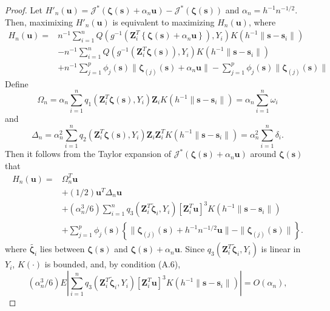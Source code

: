 \documentclass[authoryear,review, 12pt]{elsarticle}
\begin{document}
\begin{proof}
Let $H'_{n}(\bm{u})=\mathcal{J}^{*}\left(\bm{\zeta}(\bm{s})+\alpha_{n}\bm{u}\right)-\mathcal{J}^{*}\left(\bm{\zeta}(\bm{s})\right)$
and $\alpha_{n}=h^{-1}n^{-1/2}$. Then, maximixing $H'_{n}(\bm{u})$
is equivalent to maximizing $H_{n}(\bm{u})$, where 
\begin{align*}
H_{n}(\bm{u})= & n^{-1}\sum_{i=1}^{n}Q\left(g^{-1}\left(\bm{Z}_{i}^{T}\left\{ \bm{\zeta}(\bm{s})+\alpha_{n}\bm{u}\right\} \right),Y_{i}\right)K\left(h^{-1}\|\bm{s}-\bm{s}_{i}\|\right)\\
 & -n^{-1}\sum_{i=1}^{n}Q\left(g^{-1}\left(\bm{Z}_{i}^{T}\bm{\zeta}(\bm{s})\right),Y_{i}\right)K\left(h^{-1}\|\bm{s}-\bm{s}_{i}\|\right)\\
 & +n^{-1}\sum_{j=1}^{p}\phi_{j}\left(\bm{s}\right)\|\bm{\zeta}_{(j)}(\bm{s})+\alpha_{n}\bm{u}\|-\sum_{j=1}^{p}\phi_{j}\left(\bm{s}\right)\|\bm{\zeta}_{(j)}(\bm{s})\|
\end{align*}
Define
\[
\Omega_{n}=\alpha_{n}\sum_{i=1}^{n}q_{1}\left(\bm{Z}_{i}^{T}\bm{\zeta}(\bm{s}),Y_{i}\right)\bm{Z}_{i}K\left(h^{-1}\|\bm{s}-\bm{s}_{i}\|\right)=\alpha_{n}\sum_{i=1}^{n}\omega_{i}
\]
and 
\[
\Delta_{n}=\alpha_{n}^{2}\sum_{i=1}^{n}q_{2}\left(\bm{Z}_{i}^{T}\bm{\zeta}(\bm{s}),Y_{i}\right)\bm{Z}_{i}\bm{Z}_{i}^{T}K\left(h^{-1}\|\bm{s}-\bm{s}_{i}\|\right)=\alpha_{n}^{2}\sum_{i=1}^{n}\delta_{i}.
\]
Then it follows from the Taylor expansion of $\mathcal{J}^{*}\left(\bm{\zeta}(\bm{s})+\alpha_{n}\bm{u}\right)$
around $\bm{\zeta}(\bm{s})$ that
\begin{align}
H_{n}\left(\bm{u}\right)= & \Omega_{n}^{T}\bm{u}\nonumber \\
 & +(1/2)\bm{u}^{T}\Delta_{n}\bm{u}\nonumber \\
 & +\left(\alpha_{n}^{3}/6\right)\sum_{i=1}^{n}q_{3}\left(\bm{Z}_{i}^{T}\tilde{\bm{\zeta}}_{i},Y_{i}\right)\left[\bm{Z}_{i}^{T}\bm{u}\right]^{3}K\left(h^{-1}\|\bm{s}-\bm{s}_{i}\|\right)\nonumber \\
 & +\sum_{j=1}^{p}\phi_{j}\left(\bm{s}\right)\left\{ \|\bm{\zeta}_{(j)}(\bm{s})+h^{-1}n^{-1/2}\bm{u}\|-\|\bm{\zeta}_{(j)}(\bm{s})\|\right\} .\label{eq:taylor-expanded-glm-criterion}
\end{align}
where $\tilde{\bm{\zeta}_{i}}$ lies between $\bm{\zeta}(\bm{s})$
and $\bm{\zeta}(\bm{s})+\alpha_{n}\bm{u}$. Since $q_{3}\left(\bm{Z}_{i}^{T}\tilde{\bm{\zeta}}_{i},Y_{i}\right)$
is linear in $Y_{i}$, $K\left(\cdot\right)$ is bounded, and, by
condition (A.6),
\[
\left(\alpha_{n}^{3}/6\right)E\left|\sum_{i=1}^{n}q_{3}\left(\bm{Z}_{i}^{T}\tilde{\bm{\zeta}}_{i},Y_{i}\right)\left[\bm{Z}_{i}^{T}\bm{u}\right]^{3}K\left(h^{-1}\|\bm{s}-\bm{s}_{i}\|\right)\right|=O\left(\alpha_{n}\right),
\]
\end{proof}
\end{document}
